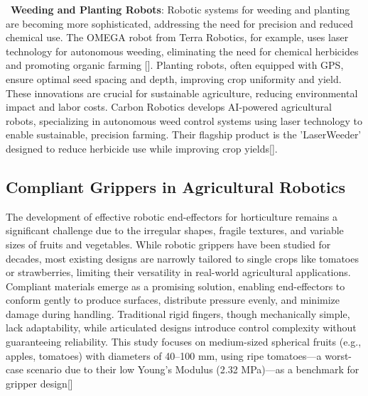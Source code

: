 \textbullet \,\textbf{ Weeding and Planting Robots}:
Robotic systems for weeding and planting are becoming more sophisticated, addressing the need for precision and reduced chemical use. The OMEGA robot from Terra Robotics, for example, uses laser technology for autonomous weeding, eliminating the need for chemical herbicides and promoting organic farming [\cite{TerraRobotics}]. Planting robots, often equipped with GPS, ensure optimal seed spacing and depth, improving crop uniformity and yield. These innovations are crucial for sustainable agriculture, reducing environmental impact and labor costs. Carbon Robotics develops AI-powered agricultural robots, specializing in autonomous weed control systems using laser technology to enable sustainable, precision farming. Their flagship product is the 'LaserWeeder' designed to reduce herbicide use while improving crop yields[\cite{CarbonRobotics}].

\subsection{Compliant Grippers in Agricultural Robotics}
The development of effective robotic end-effectors for horticulture remains a significant challenge due to the irregular shapes, fragile textures, and variable sizes of fruits and vegetables. While robotic grippers have been studied for decades, most existing designs are narrowly tailored to single crops like tomatoes or strawberries, limiting their versatility in real-world agricultural applications. Compliant materials emerge as a promising solution, enabling end-effectors to conform gently to produce surfaces, distribute pressure evenly, and minimize damage during handling. Traditional rigid fingers, though mechanically simple, lack adaptability, while articulated designs introduce control complexity without guaranteeing reliability. This study focuses on medium-sized spherical fruits (e.g., apples, tomatoes) with diameters of 40–100 mm, using ripe tomatoes—a worst-case scenario due to their low Young’s Modulus (2.32 MPa)—as a benchmark for gripper design[\cite{russo2017design}]


